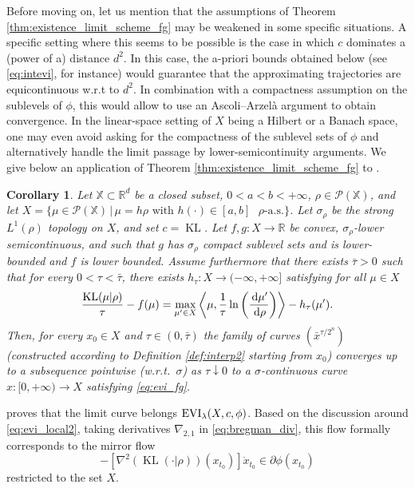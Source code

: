 \documentclass[reqno]{amsart}
\newcounter{results}[section]
\theoremstyle{plain}
\newtheorem{corollary}[results]{Corollary}
\theoremstyle{remark}
\theoremstyle{plain}
\numberwithin{equation}{section}
\theoremstyle{remark}
\newcommand{\R}{\mathbb{R}}
\newcommand{\X}{\mathbb{X}}
\newcommand{\calP}{\mathcal{P}}
\newcommand{\de}{{\,\rm d}}
\DeclareMathOperator{\KL}{KL}
\DeclareMathOperator{\EVI}{{\rm EVI}}
\begin{document}
 Before moving on, let us mention that the assumptions of Theorem \ref{thm:existence_limit_scheme_fg} may be weakened in some specific situations. A specific setting where this seems to be possible is the case in which $c$ dominates a (power of a) distance $d^2$. In this case, the a-priori bounds obtained below (see \eqref{eq:intevi}, for instance) would guarantee that the approximating trajectories are equicontinuous w.r.t to $d^2$. In combination with a compactness assumption on the sublevels of $\phi$, this would allow to use an Ascoli--Arzel\`a argument to obtain convergence. 
In the linear-space setting of $X$ being a Hilbert or a Banach space, one may even avoid asking for the compactness of the sublevel sets of $\phi$ and alternatively handle the limit passage by lower-semicontinuity arguments. We give below an application of Theorem \ref{thm:existence_limit_scheme_fg} to . 
\begin{corollary}\label{coro:KL_flow}
    Let $\X\subset \R^d$ be a closed subset, $0<a<b<+\infty$, $\rho\in \calP(\X)$, and let $X=\{\mu\in \calP(\X) \, | \, \text{$\mu =h\rho$ with $h(\cdot)\in [a,b]$ $\rho$-a.s.} \}$. Let $\sigma_\rho$ be the  strong  $L^1(\rho)$ topology on $X$, and set $c=\KL$. Let $f,g: X \to \R$ be convex, $\sigma_\rho$-lower semicontinuous, and such that $g$ has $\sigma_\rho$ compact sublevel sets  and  is lower-bounded and $f$ is lower bounded. Assume furthermore that there exists $\bar{\tau}>0$ such that for every $0<\tau< \bar{\tau}$, there exists $h_\tau:X\to (-\infty,+\infty]$  satisfying for all $\mu \in X$ 
    \begin{equation}
        \frac{\KL(\mu | \rho)}{\tau} -f(\mu)=\max_{\mu'\in X} \left\langle \mu,\frac{1}{\tau}\ln\left(\frac{ \de \mu'}{ \de \rho}\right)\right\rangle -h_\tau(\mu').\label{eq:KL_c-concavity}
    \end{equation}
    Then, for every $x_0 \in X$ and $\tau \in (0, \bar{\tau})$ the family of curves $(\bar{x}^{\tau/2^n})$ (constructed according to  Definition \ref{def:interp2}  starting from $x_0$) converges up to a subsequence pointwise (w.r.t.~$\sigma$) as $\tau \downarrow 0$ to a $\sigma$-continuous curve $x:[0,+\infty) \to X$  satisfying  \eqref{eq:evi_fg}.
\end{corollary}
  proves  that the limit curve belongs $\EVI_\lambda(X,c, \phi)$. Based on the discussion around \eqref{eq:evi_local2}, taking derivatives $\nabla_{2,1}$ in \eqref{eq:bregman_div}, this flow  formally  corresponds to the mirror flow $$-[\nabla^2 (\KL(\cdot | \rho))(x_{t_0})]\dot x_{t_0} \in \partial \phi(x_{t_0})$$ restricted to the set $X$.
\end{document}
